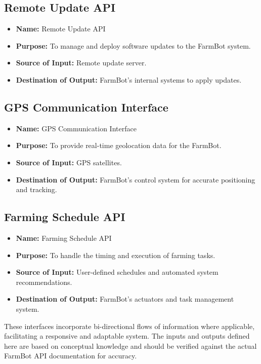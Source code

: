 \subsection{Remote Update API}
\begin{itemize}
    \item \textbf{Name:} Remote Update API
    \item \textbf{Purpose:} To manage and deploy software updates to the FarmBot system.
    \item \textbf{Source of Input:} Remote update server.
    \item \textbf{Destination of Output:} FarmBot's internal systems to apply updates.
\end{itemize}

\subsection{GPS Communication Interface}
\begin{itemize}
    \item \textbf{Name:} GPS Communication Interface
    \item \textbf{Purpose:} To provide real-time geolocation data for the FarmBot.
    \item \textbf{Source of Input:} GPS satellites.
    \item \textbf{Destination of Output:} FarmBot's control system for accurate positioning and tracking.
\end{itemize}

\subsection{Farming Schedule API}
\begin{itemize}
    \item \textbf{Name:} Farming Schedule API
    \item \textbf{Purpose:} To handle the timing and execution of farming tasks.
    \item \textbf{Source of Input:} User-defined schedules and automated system recommendations.
    \item \textbf{Destination of Output:} FarmBot's actuators and task management system.
\end{itemize}

These interfaces incorporate bi-directional flows of information where applicable, facilitating a responsive and adaptable system. The inputs and outputs defined here are based on conceptual knowledge and should be verified against the actual FarmBot API documentation for accuracy.

